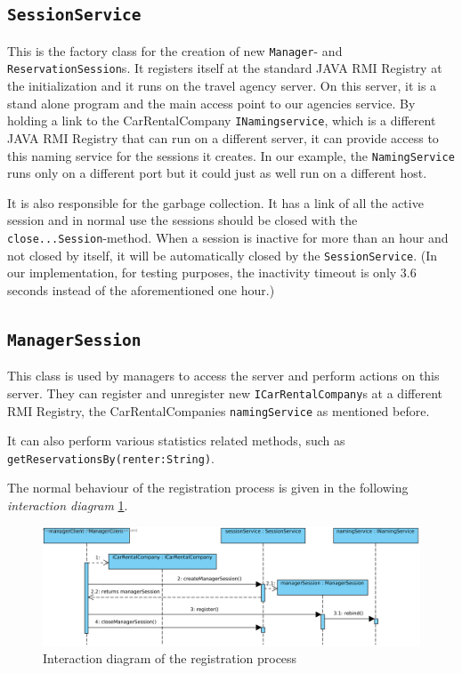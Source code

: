 \documentclass[a4paper]{article}
\begin{document}
\subsection{\texttt{SessionService}}
This is the factory class for the creation of new \texttt{Manager}- and \texttt{ReservationSession}s. It registers itself at the standard JAVA RMI Registry at the initialization and it runs on the travel agency server. On this server, it is a stand alone program and the main access point to our agencies service. By holding a link to the CarRentalCompany \texttt{INamingservice}, which is a different JAVA RMI Registry that can run on a different server, it can provide access to this naming service for the sessions it creates. In our example, the \texttt{NamingService} runs only on a different port but it could just as well run on a different host. 

It is also responsible for the garbage collection. It has a link of all the active session and in normal use the sessions should be closed with the \texttt{close...Session}-method. When a session is inactive for more than an hour and not closed by itself, it will be automatically closed by the \texttt{SessionService}. 
(In our implementation, for testing purposes, the inactivity timeout is only 3.6 seconds instead of the aforementioned one hour.)

\subsection{\texttt{ManagerSession}}
This class is used by managers to access the server and perform actions on this server. They can register and unregister new \texttt{ICarRentalCompany}s at a different RMI Registry, the CarRentalCompanies \texttt{namingService} as mentioned before. 

It can also perform various statistics related methods, such as \texttt{getReservationsBy(renter:String)}. 

The normal behaviour of the registration process is given in the following \emph{interaction diagram} \ref{fig:activity_carrentalregistration}.
\begin{figure}[hbtp]
\centering
\includegraphics[width=\textwidth]{img/CarRentalCompany registration process.png}
\caption{Interaction diagram of the registration process}
\label{fig:activity_carrentalregistration}
\end{figure}
\end{document}
